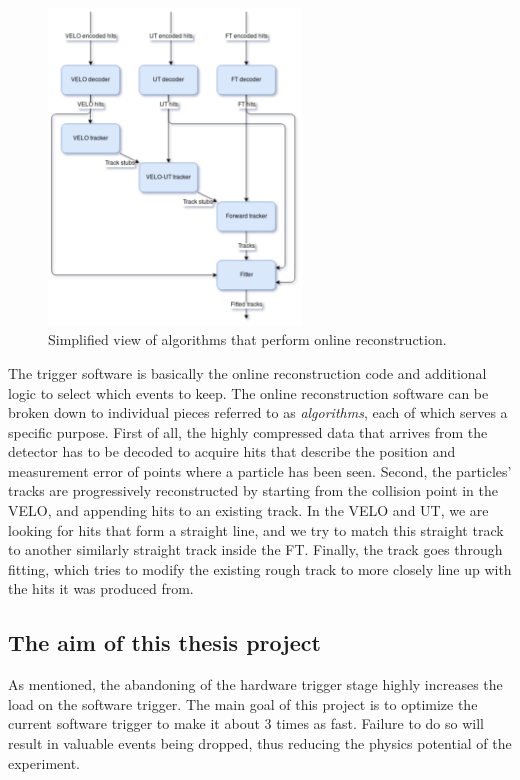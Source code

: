 \documentclass[12pt]{article}
\begin{document}
\begin{figure}[H]
	\begin{center}
		\includegraphics[width=0.6\textwidth]{algorithms_brunel}
	\end{center}
	\caption{Simplified view of algorithms that perform online reconstruction.}
	\label{fig_algorithms_brunel}
\end{figure}


The trigger software is basically the online reconstruction code and additional logic to select which events to keep. The online reconstruction software can be broken down to individual pieces referred to as \textit{algorithms}, each of which serves a specific purpose. First of all, the highly compressed data that arrives from the detector has to be decoded to acquire hits that describe the position and measurement error of points where a particle has been seen. Second, the particles' tracks are progressively reconstructed by starting from the collision point in the VELO, and appending hits to an existing track. In the VELO and UT, we are looking for hits that form a straight line, and we try to match this straight track to another similarly straight track inside the FT. Finally, the track goes through fitting, which tries to modify the existing rough track to more closely line up with the hits it was produced from.


\subsection{The aim of this thesis project}

As mentioned, the abandoning of the hardware trigger stage highly increases the load on the software trigger. The main goal of this project is to optimize the current software trigger to make it about 3 times as fast. Failure to do so will result in valuable events being dropped, thus reducing the physics potential of the experiment.
\end{document}
